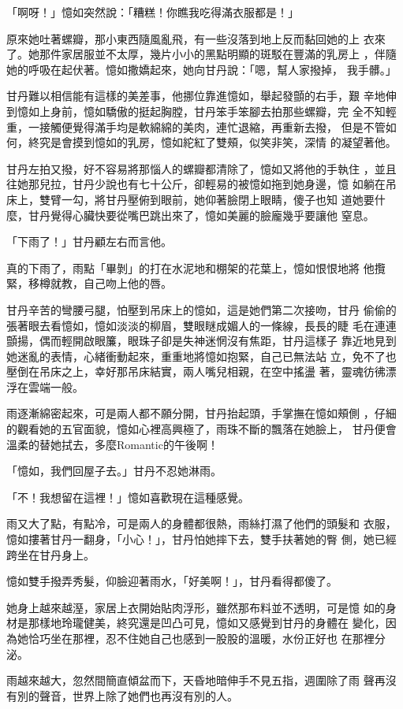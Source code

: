「啊呀！」憶如突然說：「糟糕！你瞧我吃得滿衣服都是！」

原來她吐著螺瓣，那小東西隨風亂飛，有一些沒落到地上反而黏回她的上
衣來了。她那件家居服並不太厚，幾片小小的黑點明顯的斑駁在豐滿的乳房上
，伴隨她的呼吸在起伏著。憶如撒嬌起來，她向甘丹說：「嗯，幫人家撥掉，
我手髒。」

甘丹難以相信能有這樣的美差事，他挪位靠進憶如，舉起發顫的右手，艱
辛地伸到憶如上身前，憶如驕傲的挺起胸膛，甘丹笨手笨腳去拍那些螺瓣，完
全不知輕重，一接觸便覺得滿手均是軟綿綿的美肉，連忙退縮，再重新去撥，
但是不管如何，終究是會摸到憶如的乳房，憶如紽紅了雙頰，似笑非笑，深情
的凝望著他。

甘丹左拍又撥，好不容易將那惱人的螺瓣都清除了，憶如又將他的手執住
，並且往她那兒拉，甘丹少說也有七十公斤，卻輕易的被憶如拖到她身邊，憶
如躺在吊床上，雙臂一勾，將甘丹壓俯到眼前，她仰著臉閉上眼睛，傻子也知
道她要什麼，甘丹覺得心臟快要從嘴巴跳出來了，憶如美麗的臉龐幾乎要讓他
窒息。

「下雨了！」甘丹顧左右而言他。

真的下雨了，雨點「畢剝」的打在水泥地和棚架的花葉上，憶如恨恨地將
他攬緊，移樽就教，自己吻上他的唇。

甘丹辛苦的彎腰弓腿，怕壓到吊床上的憶如，這是她們第二次接吻，甘丹
偷偷的張著眼去看憶如，憶如淡淡的柳眉，雙眼瞇成媚人的一條線，長長的睫
毛在連連顫揚，偶而輕開啟眼簾，眼珠子卻是失神迷惘沒有焦距，甘丹這樣子
靠近地見到她迷亂的表情，心緒衝動起來，重重地將憶如抱緊，自己已無法站
立，免不了也壓倒在吊床之上，幸好那吊床結實，兩人嘴兒相親，在空中搖盪
著，靈魂彷彿漂浮在雲端一般。

雨逐漸綿密起來，可是兩人都不願分開，甘丹抬起頭，手掌撫在憶如頰側
，仔細的觀看她的五官面貌，憶如心裡高興極了，雨珠不斷的飄落在她臉上，
甘丹便會溫柔的替她拭去，多麼Romantic的午後啊！

「憶如，我們回屋子去。」甘丹不忍她淋雨。

「不！我想留在這裡！」憶如喜歡現在這種感覺。

雨又大了點，有點冷，可是兩人的身體都很熱，雨絲打濕了他們的頭髮和
衣服，憶如摟著甘丹一翻身，「小心！」，甘丹怕她摔下去，雙手扶著她的臀
側，她已經跨坐在甘丹身上。

憶如雙手撥弄秀髮，仰臉迎著雨水，「好美啊！」，甘丹看得都傻了。

她身上越來越溼，家居上衣開始貼肉浮形，雖然那布料並不透明，可是憶
如的身材是那樣地玲瓏健美，終究還是凹凸可見，憶如又感覺到甘丹的身體在
變化，因為她恰巧坐在那裡，忍不住她自己也感到一股股的溫暖，水份正好也
在那裡分泌。

雨越來越大，忽然間簡直傾盆而下，天昏地暗伸手不見五指，週圍除了雨
聲再沒有別的聲音，世界上除了她們也再沒有別的人。

